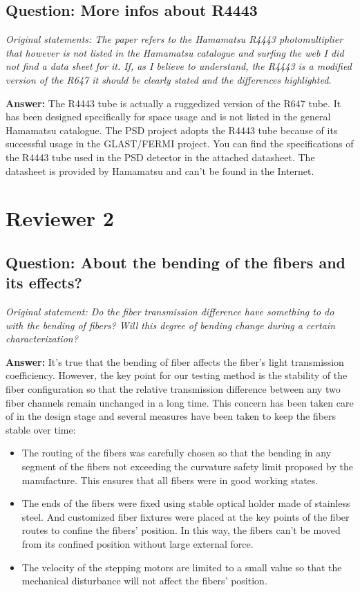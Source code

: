 \documentclass[]{article}
\begin{document}
\subsection{Question: More infos about R4443}
\textit{Original statements: The paper refers to the Hamamatsu R4443 photomultiplier that however is not listed in the Hamamatsu catalogue and surfing the web I did not find a data sheet for it. If, as I believe to understand, the R4443 is a modified version of the R647 it should be clearly stated and the differences highlighted.}\newline

\textbf{Answer:}\newline
The R4443 tube is actually a ruggedized version of the R647 tube. It has been designed specifically for space usage and is not listed in the general Hamamatsu catalogue. The PSD project adopts the R4443 tube because of its successful usage in the GLAST/FERMI project. You can find the specifications of the R4443 tube used in the PSD detector in the attached datasheet. The datasheet is provided by  Hamamatsu and can't be found in the Internet. 

\section{Reviewer 2}
\subsection{Question: About the bending of the fibers and its effects?}
\textit{Original statement: Do the fiber transmission difference have something to do with the bending of fibers?
Will this degree of bending change during a certain characterization?}\newline

\textbf{Answer:}\newline
It's true that the bending of fiber affects the fiber's light transmission coefficiency. However, the key point for our testing method is the stability of the fiber configuration so that the relative transmission difference between any two fiber channels remain unchanged in a long time. This concern has been taken care of in the design stage and several measures have been taken to keep the fibers stable over time:
\begin{itemize}
	\item The routing of the fibers was carefully chosen so that the bending in any segment of the fibers not exceeding the curvature safety limit proposed by the manufacture. This ensures that all fibers were in good working states.
	\item The ends of the fibers were fixed using stable optical holder made of stainless steel. And customized fiber fixtures were placed at the key points of the fiber routes to confine the fibers' position. In this way, the fibers can't be moved from its confined position without large external force.
	\item The velocity of the stepping motors are limited to a small value so that the mechanical disturbance will not affect the fibers' position.
\end{itemize}
\end{document}
